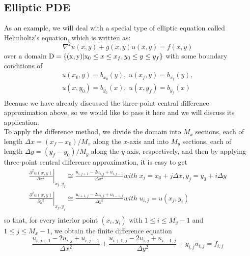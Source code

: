 \documentclass[a4paper]{article}
\begin{document}
\subsection{Elliptic PDE}
As an example, we will deal with a special type of elliptic equation called Helmholtz’s equation, which is written as:
\begin{equation}
{\nabla ^2}u(x,y) + g(x,y)u(x,y) = f(x,y)
\end{equation}
over a domain ${\rm{D = \{ (x, y)|}}{{\rm{x}}_0} \le x \le {x_f},{y_0} \le y \le {y_f}\}$ with some boundary conditions of
\begin{equation}
\begin{array}{l}
 u({x_0},y) = {b_{{x_0}}}(y),\;u({x_f},y) = {b_{{x_f}}}(y), \\
 u(x,{y_0}) = {b_{{y_0}}}(x),\;u(x,{y_f}) = {b_{{y_f}}}(x) \\
 \end{array}
\end{equation}
Because we have already discussed the three-point central difference approximation above, so we would like to pass it here and we will discuss its application.\\
To apply the difference method, we divide the domain into ${M_x}$ sections, each of length $\Delta x = ({x_f} - {x_0})/{M_x}$ along the $x$-axis and into ${M_y}$ sections, each of length $\Delta y = ({y_f} - {y_0})/{M_y}$ along the $y$-axis, respectively, and then by applying three-point central difference approximation, it is easy to get
\begin{equation}
\begin{array}{l}
 {\left. {\frac{{{\partial ^2}u(x,y)}}{{\partial {x^2}}}} \right|_{{x_j},{y_j}}} \cong \frac{{{u_{i,j + 1}} - 2{u_{i,j}} + {u_{i,j - 1}}}}{{\Delta {x^2}}} with \;{x_j} = {x_0} + j\Delta x,{y_j} = {y_0} + i\Delta y \\
 {\left. {\frac{{{\partial ^2}u(x,y)}}{{\partial {y^2}}}} \right|_{{x_j},{y_j}}} \cong \frac{{{u_{i + 1,j}} - 2{u_{i,j}} + {u_{i - 1,j}}}}{{\Delta {y^2}}} with \;{u_{i,j}} = u({x_j},{y_i}) \\
 \end{array}
\end{equation}
so that, for every interior point $({x_i},{y_i})$ with $1 \le i \le {M_y} - 1$ and $1 \le j \le {M_x} - 1$, we obtain the finite difference equation
\begin{equation}
\frac{{{u_{i,j + 1}} - 2{u_{i,j}} + {u_{i,j - 1}}}}{{\Delta {x^2}}} + \frac{{{u_{i + 1,j}} - 2{u_{i,j}} + {u_{i - 1,j}}}}{{\Delta {y^2}}} + {g_{i,j}}{u_{i,j}} = {f_{i,j}}
\end{equation}
\end{document}
